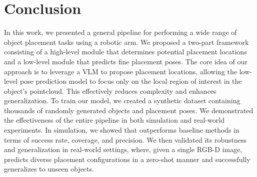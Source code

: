 \section{Conclusion}

In this work, we presented a general pipeline for performing a wide range of object placement tasks using a robotic arm. We proposed a two-part framework consisting of a high-level module that determines potential placement locations and a low-level module that predicts fine placement poses. The core idea of our approach is to leverage a VLM to propose placement locations, allowing the low-level pose prediction model to focus only on the local region of interest in the object’s pointcloud. This effectively reduces complexity and enhances generalization. To train our model, we created a synthetic dataset containing thousands of randomly generated objects and placement poses. We demonstrated the effectiveness of the entire pipeline in both simulation and real-world experiments. In simulation, we showed that \ourmethod outperforms baseline methods in terms of success rate, coverage, and precision. We then validated its robustness and generalization in real-world settings, where, given a single RGB-D image, \ourmethod predicts diverse placement configurations in a zero-shot manner and successfully generalizes to unseen objects.
